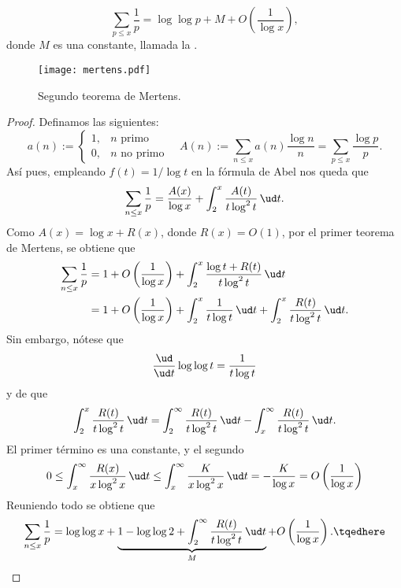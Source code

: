 \documentclass[teoria-numeros.tex]{subfiles}
\begin{document}
\begin{thmi}
	$$ \sum_{p\le x} \frac{1}{p} = \log\log p + M + O\left( \frac{1}{\log x} \right), $$
	donde $M$ es una constante, llamada la .
\end{thmi}
\begin{figure}[!hbt]
	\centering
	\texttt{[image: mertens.pdf]}
	\caption{Segundo teorema de Mertens.}%
	\label{fig:mertens}
\end{figure}
\begin{proof}
	Definamos las siguientes:
	$$ a(n) :=
	\begin{cases}
		1, & n \text{ primo} \\
		0, & n \text{ no primo}
	\end{cases}
	\quad A(n) := \sum_{n\le x} a(n)\frac{\log n}{n} = \sum_{p\le x} \frac{\log p}{p}. $$
	Así pues, empleando $f(t) = 1/\log t$ en la fórmula de Abel nos queda que
	$$ \sum_{n\le x} \frac{1}{p} = \frac{A(x)}{\log x} + \int_{2}^{x} \frac{A(t)}{t \log^2 t} \, \ud t. $$
	Como $A(x) = \log x + R(x)$, donde $R(x) = O(1)$, por el primer teorema de Mertens, se obtiene que
	\begin{align*}
		\sum_{n\le x} \frac{1}{p} &= 1 + O\left( \frac{1}{\log x} \right) + \int_{2}^{x} \frac{\log t + R(t)}{t \log^2 t} \, \ud t \\
		&= 1 + O\left( \frac{1}{\log x} \right) + \int_{2}^{x} \frac{1}{t\log t} \, \ud t + \int_{2}^{x} \frac{R(t)}{t\log^2 t} \, \ud t.
	\end{align*}
	Sin embargo, nótese que
	$$ \frac{\ud}{\ud t}\log\log t = \frac{1}{t\log t} $$
	y de que
	$$ \int_{2}^{x} \frac{R(t)}{t\log^2 t} \, \ud t = \int_{2}^{\infty} \frac{R(t)}{t\log^2 t} \, \ud t - \int_{x}^{\infty} \frac{R(t)}{t\log^2 t} \, \ud t. $$
	El primer término es una constante, y el segundo
	$$ 0\le \int_{x}^{\infty} \frac{R(x)}{x\log^2 x} \, \ud t \le \int_{x}^{\infty} \frac{K}{x\log^2 x} \, \ud t = -\frac{K}{\log x}
	= O\left( \frac{1}{\log x} \right) $$
	Reuniendo todo se obtiene que
	\begin{equation}
		\sum_{n\le x} \frac{1}{p} = \log\log x
		+ \underbrace{ 1 -\log\log 2 + \int_{2}^{\infty} \frac{R(t)}{t\log^2 t} \, \ud t }_{M} + O\left( \frac{1}{\log x} \right). \tqedhere
	\end{equation}
\end{proof}
\end{document}
